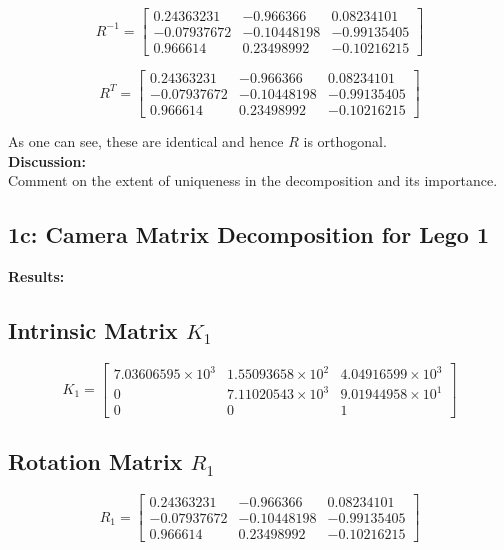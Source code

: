 \documentclass{article}
\begin{document}
\[
R^{-1} = \begin{bmatrix}
  0.24363231 & -0.966366 & 0.08234101 \\
  -0.07937672 & -0.10448198 & -0.99135405 \\
  0.966614 & 0.23498992 & -0.10216215
  \end{bmatrix}
\]

\[
R^T = \begin{bmatrix}
  0.24363231 & -0.966366 & 0.08234101 \\
  -0.07937672 & -0.10448198 & -0.99135405 \\
  0.966614 & 0.23498992 & -0.10216215
  \end{bmatrix}
\]

As one can see, these are identical and hence \( R \) is orthogonal. \\



\textbf{Discussion:} \\
Comment on the extent of uniqueness in the decomposition and its importance.

\subsection{1c: Camera Matrix Decomposition for Lego 1}
\textbf{Results:} \\
\subsection*{Intrinsic Matrix \( K_1 \)}
\[
K_1 =
\begin{bmatrix}
7.03606595 \times 10^3 & 1.55093658 \times 10^2 & 4.04916599 \times 10^3 \\
0 & 7.11020543 \times 10^3 & 9.01944958 \times 10^1 \\
0 & 0 & 1
\end{bmatrix}
\]

\subsection*{Rotation Matrix \( R_1 \)}
\label{sec:1c}
\[
R_1 =
\begin{bmatrix}
0.24363231 & -0.966366 & 0.08234101 \\
-0.07937672 & -0.10448198 & -0.99135405 \\
0.966614 & 0.23498992 & -0.10216215
\end{bmatrix}
\]
\end{document}
